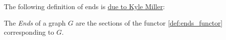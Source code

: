The following definition of ends is \href{https://leanprover.zulipchat.com/#narrow/stream/116395-maths/topic/Geometric.20group.20theory/near/290624806}{due to Kyle Miller}:

\begin{definition}[Ends]
  \label{def:ends_cat}
  \leanok

  The \emph{Ends} of a graph $G$ are the sections of the functor \ref{def:ends_functor} corresponding to $G$.
\end{definition}
